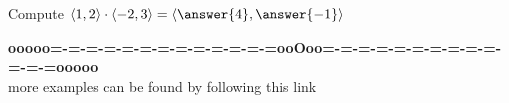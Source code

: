 \documentclass{ximera}
\begin{document}
\begin{question} 


Compute  $\langle 1, 2 \rangle  \cdot \langle -2, 3 \rangle = \left\langle \answer{4}, \answer{-1} \right\rangle $



\end{question}











\begin{center}
\textbf{\textcolor{green!50!black}{ooooo=-=-=-=-=-=-=-=-=-=-=-=-=ooOoo=-=-=-=-=-=-=-=-=-=-=-=-=ooooo}} \\

more examples can be found by following this link\\ 

\end{center}
\end{document}
